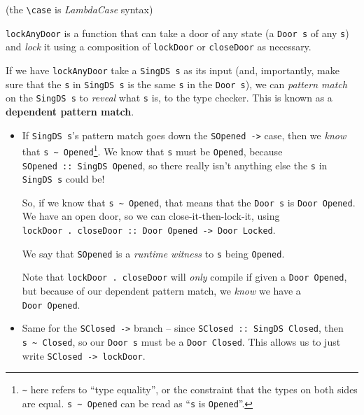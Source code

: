 \documentclass[]{article}
\begin{document}
(the \texttt{\textbackslash{}case} is \emph{LambdaCase} syntax)

\texttt{lockAnyDoor} is a function that can take a door of any state (a
\texttt{Door\ s} of any \texttt{s}) and \emph{lock} it using a composition of
\texttt{lockDoor} or \texttt{closeDoor} as necessary.

If we have \texttt{lockAnyDoor} take a \texttt{SingDS\ s} as its input (and,
importantly, make sure that the \texttt{s} in \texttt{SingDS\ s} is the same
\texttt{s} in the \texttt{Door\ s}), we can \emph{pattern match} on the
\texttt{SingDS\ s} to \emph{reveal} what \texttt{s} is, to the type checker.
This is known as a \textbf{dependent pattern match}.

\begin{itemize}
\item
  If \texttt{SingDS\ s}'s pattern match goes down the
  \texttt{SOpened\ -\textgreater{}} case, then we \emph{know} that
  \texttt{s\ \textasciitilde{}\ \textquotesingle{}Opened}\footnote{\texttt{\textasciitilde{}}
    here refers to ``type equality'', or the constraint that the types on both
    sides are equal. \texttt{s\ \textasciitilde{}\ \textquotesingle{}Opened} can
    be read as ``\texttt{s} is \texttt{\textquotesingle{}Opened}''.}. We know
  that \texttt{s} must be \texttt{\textquotesingle{}Opened}, because
  \texttt{SOpened\ ::\ SingDS\ \textquotesingle{}Opened}, so there really isn't
  anything else the \texttt{s} in \texttt{SingDS\ s} could be!

  So, if we know that \texttt{s\ \textasciitilde{}\ \textquotesingle{}Opened},
  that means that the \texttt{Door\ s} is
  \texttt{Door\ \textquotesingle{}Opened}. We have an open door, so we can
  close-it-then-lock-it, using
  \texttt{lockDoor\ .\ closeDoor\ ::\ Door\ \textquotesingle{}Opened\ -\textgreater{}\ Door\ \textquotesingle{}Locked}.

  We say that \texttt{SOpened} is a \emph{runtime witness} to \texttt{s} being
  \texttt{\textquotesingle{}Opened}.

  Note that \texttt{lockDoor\ .\ closeDoor} will \emph{only} compile if given a
  \texttt{Door\ \textquotesingle{}Opened}, but because of our dependent pattern
  match, we \emph{know} we have a \texttt{Door\ \textquotesingle{}Opened}.
\item
  Same for the \texttt{SClosed\ -\textgreater{}} branch -- since
  \texttt{SClosed\ ::\ SingDS\ \textquotesingle{}Closed}, then
  \texttt{s\ \textasciitilde{}\ \textquotesingle{}Closed}, so our
  \texttt{Door\ s} must be a \texttt{Door\ \textquotesingle{}Closed}. This
  allows us to just write \texttt{SClosed\ -\textgreater{}\ lockDoor}.


\end{itemize}
\end{document}
